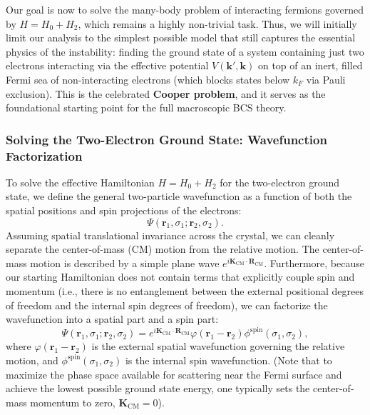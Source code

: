 Our goal is now to solve the many-body problem of interacting fermions governed by \( H = H_0 + H_2 \), which remains a highly non-trivial task. Thus, we will initially limit our analysis to the simplest possible model that still captures the essential physics of the instability: finding the ground state of a system containing just two electrons interacting via the effective potential \( V(\mathbf{k}', \mathbf{k}) \) on top of an inert, filled Fermi sea of non-interacting electrons (which blocks states below \( k_F \) via Pauli exclusion). This is the celebrated \textbf{Cooper problem}, and it serves as the foundational starting point for the full macroscopic BCS theory.

\subsubsection{Solving the Two-Electron Ground State: Wavefunction Factorization}

To solve the effective Hamiltonian \( H = H_0 + H_2 \) for the two-electron ground state, we define the general two-particle wavefunction as a function of both the spatial positions and spin projections of the electrons:
\[
    \Psi(\mathbf{r}_1, \sigma_1; \mathbf{r}_2, \sigma_2).
\]
Assuming spatial translational invariance across the crystal, we can cleanly separate the center-of-mass (CM) motion from the relative motion. The center-of-mass motion is described by a simple plane wave \( e^{i\mathbf{K}_{\text{CM}} \cdot \mathbf{R}_{\text{CM}}} \). Furthermore, because our starting Hamiltonian does not contain terms that explicitly couple spin and momentum (i.e., there is no entanglement between the external positional degrees of freedom and the internal spin degrees of freedom), we can factorize the wavefunction into a spatial part and a spin part:
\begin{equation} \label{eq:cooper_wavefunction_ansatz}
    \Psi(\mathbf{r}_1, \sigma_1; \mathbf{r}_2, \sigma_2) = e^{i\mathbf{K}_{\text{CM}} \cdot \mathbf{R}_{\text{CM}}} \varphi(\mathbf{r}_1 - \mathbf{r}_2) \phi^{\text{spin}}(\sigma_1, \sigma_2),
\end{equation}
where \( \varphi(\mathbf{r}_1 - \mathbf{r}_2) \) is the external spatial wavefunction governing the relative motion, and \( \phi^{\text{spin}}(\sigma_1, \sigma_2) \) is the internal spin wavefunction. (Note that to maximize the phase space available for scattering near the Fermi surface and achieve the lowest possible ground state energy, one typically sets the center-of-mass momentum to zero, \( \mathbf{K}_{\text{CM}} = 0 \)).

